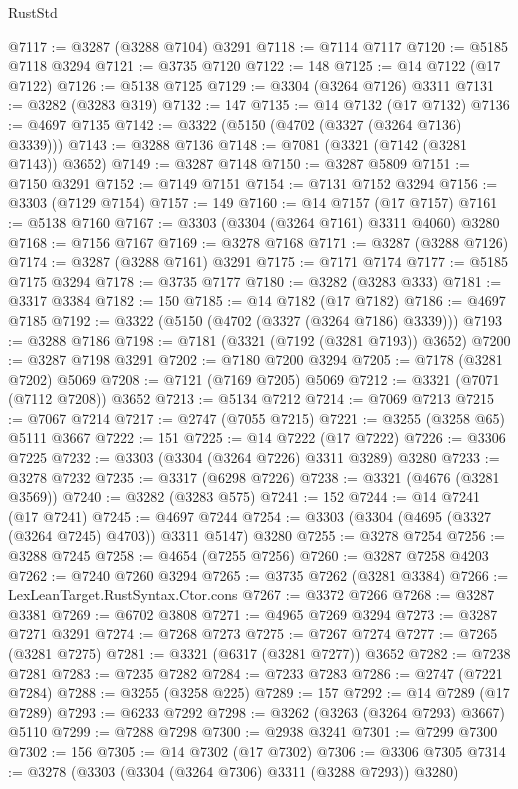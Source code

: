 \begin{lexlean}{RustStd}
\begin{coremodule}
@7117 := @3287 (@3288 @7104) @3291
@7118 := @7114 @7117
@7120 := @5185 @7118 @3294
@7121 := @3735 @7120
@7122 := 148
@7125 := @14 @7122 (@17 @7122)
@7126 := @5138 @7125
@7129 := @3304 (@3264 @7126) @3311
@7131 := @3282 (@3283 @319)
@7132 := 147
@7135 := @14 @7132 (@17 @7132)
@7136 := @4697 @7135
@7142 := @3322 (@5150 (@4702 (@3327 (@3264 @7136) @3339)))
@7143 := @3288 @7136
@7148 := @7081 (@3321 (@7142 (@3281 @7143)) @3652)
@7149 := @3287 @7148
@7150 := @3287 @5809
@7151 := @7150 @3291
@7152 := @7149 @7151
@7154 := @7131 @7152 @3294
@7156 := @3303 (@7129 @7154)
@7157 := 149
@7160 := @14 @7157 (@17 @7157)
@7161 := @5138 @7160
@7167 := @3303 (@3304 (@3264 @7161) @3311 @4060) @3280
@7168 := @7156 @7167
@7169 := @3278 @7168
@7171 := @3287 (@3288 @7126)
@7174 := @3287 (@3288 @7161) @3291
@7175 := @7171 @7174
@7177 := @5185 @7175 @3294
@7178 := @3735 @7177
@7180 := @3282 (@3283 @333)
@7181 := @3317 @3384
@7182 := 150
@7185 := @14 @7182 (@17 @7182)
@7186 := @4697 @7185
@7192 := @3322 (@5150 (@4702 (@3327 (@3264 @7186) @3339)))
@7193 := @3288 @7186
@7198 := @7181 (@3321 (@7192 (@3281 @7193)) @3652)
@7200 := @3287 @7198 @3291
@7202 := @7180 @7200 @3294
@7205 := @7178 (@3281 @7202) @5069
@7208 := @7121 (@7169 @7205) @5069
@7212 := @3321 (@7071 (@7112 @7208)) @3652
@7213 := @5134 @7212
@7214 := @7069 @7213
@7215 := @7067 @7214
@7217 := @2747 (@7055 @7215)
@7221 := @3255 (@3258 @65) @5111 @3667
@7222 := 151
@7225 := @14 @7222 (@17 @7222)
@7226 := @3306 @7225
@7232 := @3303 (@3304 (@3264 @7226) @3311 @3289) @3280
@7233 := @3278 @7232
@7235 := @3317 (@6298 @7226)
@7238 := @3321 (@4676 (@3281 @3569))
@7240 := @3282 (@3283 @575)
@7241 := 152
@7244 := @14 @7241 (@17 @7241)
@7245 := @4697 @7244
@7254 := @3303 (@3304 (@4695 (@3327 (@3264 @7245) @4703)) @3311 @5147) @3280
@7255 := @3278 @7254
@7256 := @3288 @7245
@7258 := @4654 (@7255 @7256)
@7260 := @3287 @7258 @4203
@7262 := @7240 @7260 @3294
@7265 := @3735 @7262 (@3281 @3384)
@7266 := LexLeanTarget.RustSyntax.Ctor.cons
@7267 := @3372 @7266
@7268 := @3287 @3381
@7269 := @6702 @3808
@7271 := @4965 @7269 @3294
@7273 := @3287 @7271 @3291
@7274 := @7268 @7273
@7275 := @7267 @7274
@7277 := @7265 (@3281 @7275)
@7281 := @3321 (@6317 (@3281 @7277)) @3652
@7282 := @7238 @7281
@7283 := @7235 @7282
@7284 := @7233 @7283
@7286 := @2747 (@7221 @7284)
@7288 := @3255 (@3258 @225)
@7289 := 157
@7292 := @14 @7289 (@17 @7289)
@7293 := @6233 @7292
@7298 := @3262 (@3263 (@3264 @7293) @3667) @5110
@7299 := @7288 @7298
@7300 := @2938 @3241
@7301 := @7299 @7300
@7302 := 156
@7305 := @14 @7302 (@17 @7302)
@7306 := @3306 @7305
@7314 := @3278 (@3303 (@3304 (@3264 @7306) @3311 (@3288 @7293)) @3280)

\end{coremodule}
\end{lexlean}
